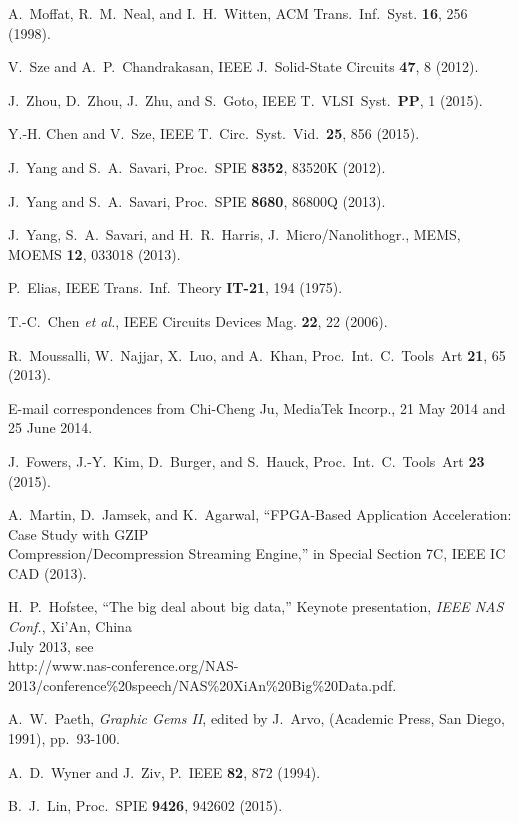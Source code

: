 \documentclass{article}
\begin{document}
\noindent A.~Moffat, R.~M.~Neal, and I.~H.~Witten, 
ACM Trans.~Inf.~Syst. {\bf 16}, 256 (1998). 

\noindent V.~Sze and A.~P.~Chandrakasan, 
IEEE J.~Solid-State Circuits {\bf 47}, 8 (2012).

\noindent J.~Zhou, D.~Zhou, J.~Zhu, and S.~Goto, 
IEEE T.~VLSI~Syst.~{\bf PP}, 1 (2015).

\noindent Y.-H. Chen and V.~Sze, 
IEEE T.~Circ.~Syst.~Vid.~{\bf 25}, 856 (2015).

\noindent J.~Yang and S.~A.~Savari, 
Proc.~SPIE {\bf 8352}, 83520K (2012).

\noindent J.~Yang and S.~A.~Savari, 
Proc.~SPIE {\bf 8680}, 86800Q (2013).

\noindent J.~Yang, S.~A.~Savari, and H.~R.~Harris,
J.~Micro/Nanolithogr., MEMS, MOEMS {\bf 12}, 033018 (2013).

\noindent P.~Elias, IEEE Trans.~Inf.~Theory {\bf IT-21}, 194 (1975).

\noindent T.-C.~Chen {\em et al.}, IEEE Circuits Devices Mag.
{\bf 22}, 22 (2006).

\noindent R.~Moussalli, W.~Najjar, X.~Luo, and A.~Khan,
Proc.~Int.~C.~Tools~Art {\bf 21}, 65 (2013).

\noindent E-mail correspondences from Chi-Cheng Ju, MediaTek Incorp.,
21 May 2014 and 25 June 2014.

\noindent J.~Fowers, J.-Y.~Kim, D.~Burger, and S.~Hauck,
Proc.~Int.~C.~Tools~Art {\bf 23} (2015).

\noindent A.~Martin, D.~Jamsek, and K.~Agarwal, ``FPGA-Based
Application Acceleration: Case Study with GZIP \\
\indent Compression/Decompression Streaming Engine,'' in Special Section 7C, 
IEEE IC CAD (2013).

\noindent H.~P.~Hofstee, ``The big deal about big data,'' Keynote 
presentation, {\em IEEE NAS Conf.}, Xi'An, China \\
 July 2013, see \\
\indent http://www.nas-conference.org/NAS-2013/conference\%20speech/NAS\%20XiAn\%20Big\%20Data.pdf.

\noindent A.~W.~Paeth, {\em Graphic Gems II}, edited by J.~Arvo,
(Academic Press, San Diego, 1991), pp.~93-100.

\noindent A.~D.~Wyner and J.~Ziv, P.~IEEE {\bf 82}, 872 (1994).

\noindent B.~J.~Lin, Proc.~SPIE {\bf 9426}, 942602 (2015).
\end{document}
